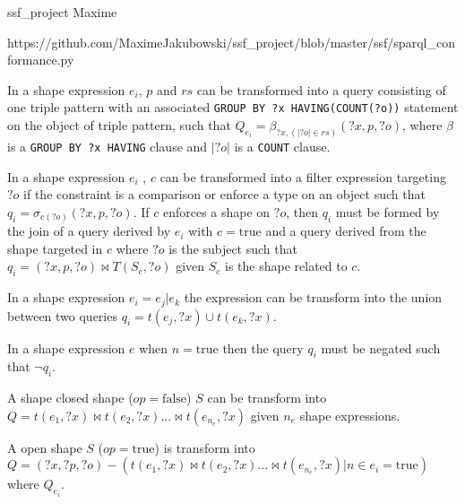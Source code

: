ssf_project Maxime

https://github.com/MaximeJakubowski/ssf_project/blob/master/ssf/sparql_conformance.py

\fi

\begin{prop}\label{prop:triplePattern}
   In a shape expression $e_i$, $p$ and $rs$ can be transformed into a query consisting of one triple pattern with an associated \texttt{GROUP BY ?x HAVING(COUNT(?o))} statement on the object of triple pattern,
   such that
   $Q_{e_i} = \beta_{?x, (|?o| \in rs)}(?x, p, ?o)$,
   where $\beta$ is a \texttt{GROUP BY ?x HAVING} clause and $|?o|$ is a \texttt{COUNT} clause. 
\end{prop}

\begin{prop}
   In a shape expression $e_i$ , $c$ can be transformed into a filter expression targeting $?o$ if the constraint is a comparison or enforce a type on an object such that
   $q_{i} = \sigma_{c(?o)}(?x, p, ?o)$. 
   If $c$ enforces a shape on $?o$, then $q_i$ must be formed by the join of a query derived by $e_i$ with $c = \mathrm{true}$ and a query derived from the shape targeted in $c$ where $?o$ is the subject 
   such that $q_{i}= (?x, p, ?o) \bowtie T(S_c,?o)$ given $S_c$ is the shape related to $c$.
\end{prop}

\begin{prop}
   In a shape expression $e_i = e_j|e_k$ the expression can be transform into the union between two queries
   $q_{i} = t(e_j, ?x) \cup t(e_k, ?x)$.
\end{prop}

\begin{prop}
   In a shape expression $e$ when $n= \mathrm{true}$ then the query $q_i$ must be negated such that $\neg q_i$.
\end{prop}

\begin{prop}
   A shape closed shape ($op = \mathrm{false}$) $S$ can be transform into $Q = t(e_1, ?x) \bowtie t(e_2, ?x) ... \bowtie t(e_{n_e}, ?x)$ given $n_e$ shape expressions.
\end{prop}

\begin{prop}
   A open shape $S$ ($op = \mathrm{true}$) is transform into $Q = (?x, ?p, ?o) -  (t(e_1, ?x) \bowtie  t(e_2, ?x) ... \bowtie t(e_{n_e}, ?x)| n\in e_i = \mathrm{true}) $ where $Q_{e_i}$.
\end{prop}

